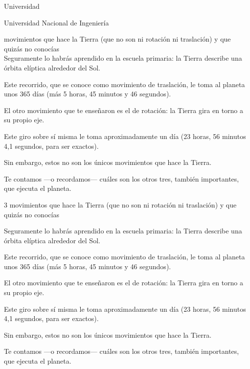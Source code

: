 \documentclass[12pt,a4paper]{article}
\begin{document}
\begin{center}
	Universidad
\end{center}

\noindent Universidad Nacional de Ingeniería

 movimientos que hace la Tierra (que no son ni rotación ni traslación) 
y que quizás no conocías\\[3cm]


Seguramente lo habrás aprendido en la escuela primaria: la Tierra describe una órbita elíptica alrededor del Sol.

Este recorrido, que se conoce como movimiento de traslación, le toma al planeta unos 365 días 
(más 5 horas, 45 minutos y 46 segundos).

El otro movimiento que te enseñaron es el de rotación: la Tierra gira en torno a su propio eje.

Este giro sobre sí misma le toma aproximadamente un día (23 horas, 56 minutos 4,1 segundos, para ser exactos). 

Sin embargo, estos no son los únicos movimientos que hace la Tierra.

Te contamos —o recordamos— cuáles son los otros tres, también importantes, que ejecuta el planeta.

3 movimientos que hace la Tierra (que no son ni rotación ni traslación) 
y que quizás no conocías


Seguramente lo habrás aprendido en la escuela primaria: la Tierra describe una órbita elíptica alrededor del Sol.

Este recorrido, que se conoce como movimiento de traslación, le toma al planeta unos 365 días 
(más 5 horas, 45 minutos y 46 segundos).

El otro movimiento que te enseñaron es el de rotación: la Tierra gira en torno a su propio eje.

Este giro sobre sí misma le toma aproximadamente un día (23 horas, 56 minutos 4,1 segundos, para ser exactos). 

Sin embargo, estos no son los únicos movimientos que hace la Tierra.

Te contamos —o recordamos— cuáles son los otros tres, también importantes, que ejecuta el planeta.
\end{document}
